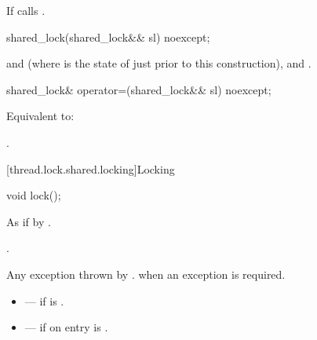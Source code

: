\begin{itemdescr}
\pnum
\effects
If  calls .
\end{itemdescr}

%
\begin{itemdecl}
shared_lock(shared_lock&& sl) noexcept;
\end{itemdecl}

\begin{itemdescr}
\pnum
\ensures
{} and  (where
 is the state of  just prior to this construction),
 and .
\end{itemdescr}

%
\begin{itemdecl}
shared_lock& operator=(shared_lock&& sl) noexcept;
\end{itemdecl}

\begin{itemdescr}
\pnum
\effects
Equivalent to: 

\pnum
\returns
{}.
\end{itemdescr}

[thread.lock.shared.locking]{Locking}

%
\begin{itemdecl}
void lock();
\end{itemdecl}

\begin{itemdescr}
\pnum
\effects
As if by .

\pnum
\ensures
{}.

\pnum
\throws
Any exception thrown by .
 when an exception is required.

\pnum
\errors
\begin{itemize}
\item {} --- if  is .
\item {} --- if on entry  is
.
\end{itemize}
\end{itemdescr}

